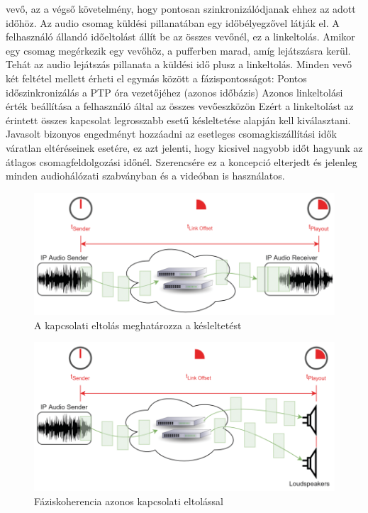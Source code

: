 vevő, az a végső követelmény, hogy pontosan szinkronizálódjanak ehhez az adott időhöz.
Az audio csomag küldési pillanatában egy időbélyegzővel látják el. A felhasználó állandó időeltolást állít be az
összes vevőnél, ez a linkeltolás. Amikor egy csomag megérkezik egy vevőhöz, a
pufferben marad, amíg lejátszásra kerül. Tehát az audio lejátszás pillanata a
küldési idő plusz a linkeltolás. Minden vevő két feltétel mellett érheti el egymás
között a fázispontosságot: 
Pontos időszinkronizálás a PTP óra vezetőjéhez (azonos időbázis) 
Azonos linkeltolási érték beállítása a felhasználó által az összes vevőeszközön
Ezért a linkeltolást az érintett összes kapcsolat legrosszabb esetű késleltetése alapján kell kiválasztani. 
Javasolt bizonyos engedményt hozzáadni az esetleges csomagkiszállítási idők váratlan eltéréseinek esetére,
ez azt jelenti, hogy kicsivel nagyobb időt hagyunk az átlagos csomagfeldolgozási időnél.
Szerencsére ez a koncepció elterjedt és jelenleg minden audiohálózati szabványban és a videóban is használatos. 
\begin{figure}[H]
	\centering
	\includegraphics[width=\linewidth, keepaspectratio]{figures/link_offset_latency.png}
	\caption{A kapcsolati eltolás meghatározza a késleltetést \cite{AHNERT2023}}
	\label {fig:link_offset_latency}
\end{figure}
\begin{figure}[H]
	\centering
	\includegraphics[width=\linewidth, keepaspectratio]{figures/phase_coherence_link_offset.png}
	\caption{Fáziskoherencia azonos kapcsolati eltolással \cite{AHNERT2023}}
	\label {fig:phase_coherence_link_offset}
\end{figure}
